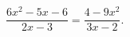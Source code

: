 \begin{ex}[type=equation]
	\begin{condition}
		$\dfrac{6x^2 - 5x - 6}{2x - 3} = \dfrac{4-9x^2}{3x - 2}.$
	\end{condition}
\end{ex}